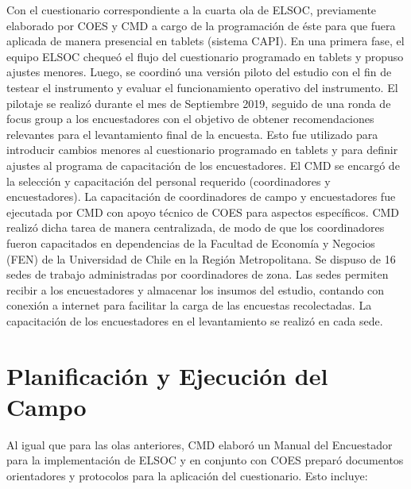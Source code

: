 \documentclass[
]{book}
\begin{document}
Con el cuestionario correspondiente a la cuarta ola de ELSOC, previamente elaborado por COES y CMD a cargo de la programación de éste para que fuera aplicada de manera presencial en tablets (sistema CAPI). En una primera fase, el equipo ELSOC chequeó el flujo del cuestionario programado en tablets y propuso ajustes menores. Luego, se coordinó una versión piloto del estudio con el fin de testear el instrumento y evaluar el funcionamiento operativo del instrumento.
El pilotaje se realizó durante el mes de Septiembre 2019, seguido de una ronda de focus group a los encuestadores con el objetivo de obtener recomendaciones relevantes para el levantamiento final de la encuesta. Esto fue utilizado para introducir cambios menores al cuestionario programado en tablets y para definir ajustes al programa de capacitación de los encuestadores.
El CMD se encargó de la selección y capacitación del personal requerido (coordinadores y encuestadores). La capacitación de coordinadores de campo y encuestadores fue ejecutada por CMD con apoyo técnico de COES para aspectos específicos. CMD realizó dicha tarea de manera centralizada, de modo de que los coordinadores fueron capacitados en dependencias de la Facultad de Economía y Negocios (FEN) de la Universidad de Chile en la Región Metropolitana.
Se dispuso de 16 sedes de trabajo administradas por coordinadores de zona. Las sedes permiten recibir a los encuestadores y almacenar los insumos del estudio, contando con conexión a internet para facilitar la carga de las encuestas recolectadas. La capacitación de los encuestadores en el levantamiento se realizó en cada sede.

\hypertarget{planificaciuxf3n-y-ejecuciuxf3n-del-campo}{%
\section{Planificación y Ejecución del Campo}\label{planificaciuxf3n-y-ejecuciuxf3n-del-campo}}

Al igual que para las olas anteriores, CMD elaboró un Manual del Encuestador para la implementación de ELSOC y en conjunto con COES preparó documentos orientadores y protocolos para la aplicación del cuestionario. Esto incluye:
\end{document}
